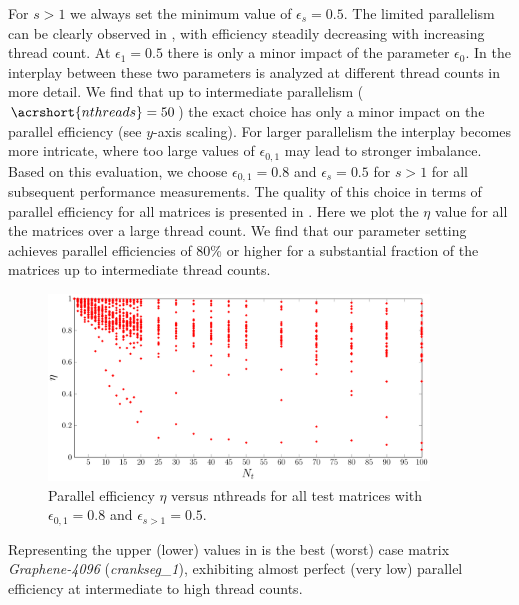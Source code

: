 %
For $s > 1$ we always set the minimum value of $\epsilon_s=0.5$. The limited
parallelism can be clearly observed in , with efficiency
steadily decreasing with increasing thread count. At
$\epsilon_1=0.5$ there is only a minor impact of the parameter
$\epsilon_0$. In  the interplay
between these two parameters is analyzed at different thread counts in more
detail. We find that up to intermediate parallelism ($\acrshort{nthreads}=50$)
the exact choice has only a minor impact on the parallel efficiency (see $y$-axis
scaling). For larger parallelism the interplay becomes more intricate,
where too large values of $\epsilon_{0,1}$ may lead to stronger imbalance. Based
on this evaluation, we choose $\epsilon_{0,1}=0.8$ and $\epsilon_s=0.5$ for $s>1$
for all subsequent performance measurements. The quality of this choice in terms of
parallel efficiency for all matrices is presented
in . Here we plot the $\eta$ value for all the
matrices over a large thread count. We find that our parameter setting achieves
parallel efficiencies of 80\% or higher for a substantial fraction of the
matrices up to intermediate thread counts.
   \begin{figure}[t]
   	\centering
   	\includegraphics[width=0.9\textwidth]{pics/param_study/scatter_plot}
   	\caption{Parallel efficiency $\eta$ versus \acrshort{nthreads} for all test matrices with $\epsilon_{0,1} = 0.8$ and $\epsilon_{s>1} = 0.5$.}
  	\label{fig:param_all_mtx_stat}
   \end{figure}
Representing the upper (lower) values in  is the
best (worst) case matrix \emph{Graphene-4096} (\emph{crankseg\_1}), exhibiting
almost perfect (very low) parallel efficiency at intermediate to high thread
counts.

